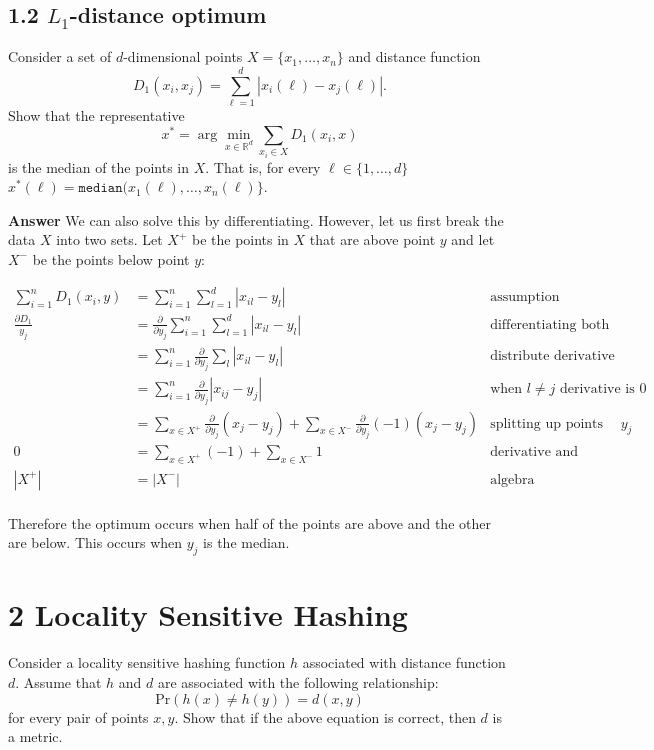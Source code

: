 \documentclass[11pt]{article}
\newcommand{\task}[1]{\section*{\normalsize #1}}
\begin{document}
\subsection*{1.2 $L_1$-distance optimum} 
Consider a set of $d$-dimensional points $X=\{x_1,\ldots , x_n\}$ and distance function 
$$D_1(x_i,x_j) = \sum_{\ell=1}^d\left |x_i(\ell)-x_j(\ell)\right|.$$ Show that the representative 
$$
x^\ast = \arg\min_{x\in \mathbb{R}^d}\sum_{x_i\in X}D_1(x_i,x)
$$
is the median of the points in $X$. That is, for every $\ell\in\{1,\ldots ,d\}$
$x^\ast(\ell)=\texttt{median}(x_1(\ell),\ldots , x_n(\ell)\}$.\newline\newline

\noindent\textbf{Answer}
We can also solve this by differentiating. However, let us first break the data $X$ into two sets. Let $X^+$ be the points in $X$ that are above point $y$ and let $X^-$ be the points below point $y$:

\begin{align*}
\sum\limits_{i=1}^n D_1(x_i,y) &= \sum\limits_{i=1}^n \sum\limits_{l=1}^d |x_{il} - y_l| &\text{assumption}\\
\frac{\partial D_1}{y_j} &= \frac{\partial}{\partial y_j} \sum\limits_{i=1}^n \sum\limits_{l=1}^d |x_{il} - y_l| &\text{differentiating both sides}\\
  &= \sum\limits_{i=1}^n \frac{\partial}{\partial y_j}\sum\limits_{l} |x_{il} - y_l| &\text{distribute derivative operator}\\
  &= \sum\limits_{i=1}^n \frac{\partial}{\partial y_j} |x_{ij} - y_j| &\text{when }l\neq j\text{ derivative is 0}\\
  &= \sum\limits_{x\in X^+} \frac{\partial}{\partial y_j} (x_j - y_j) + \sum\limits_{x\in X^-} \frac{\partial}{\partial y_j} (-1)(x_j - y_j) &\text{splitting up points above and below }y_j\\
0 &= \sum\limits_{x\in X^+} (-1) + \sum\limits_{x\in X^-} 1 &\text{derivative and setting derivative to 0}\\
|X^+| &= |X^-| &\text{algebra}\\
\end{align*}

Therefore the optimum occurs when half of the points are above and the other are below. This occurs when $y_j$ is the median.\newpage


\task{2 Locality Sensitive Hashing}
Consider a locality sensitive hashing function $h$ associated with distance function $d$. Assume that $h$ and $d$ are associated with the following relationship:
$$\text{Pr}(h(x)\neq h(y)) = d(x,y)$$
for every pair of points $x,y$. Show that if the above equation is correct, then $d$ is a metric.\newline\newline
\end{document}
